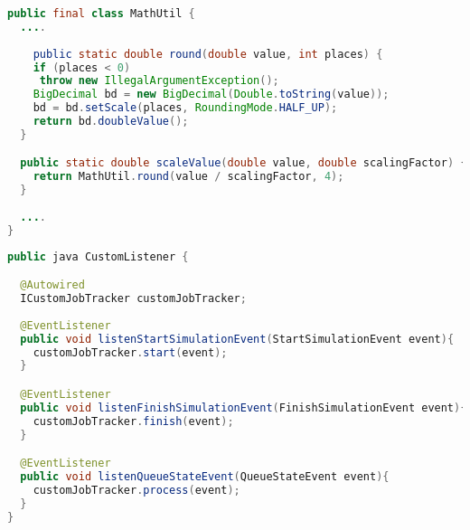 \begin{lstlisting}[language=Java,firstnumber=1, caption={MathUtil.java}, label=lst:math]
public final class MathUtil {
  ....
  
    public static double round(double value, int places) {
    if (places < 0)
     throw new IllegalArgumentException();
    BigDecimal bd = new BigDecimal(Double.toString(value));
    bd = bd.setScale(places, RoundingMode.HALF_UP);
    return bd.doubleValue();
  }

  public static double scaleValue(double value, double scalingFactor) {
    return MathUtil.round(value / scalingFactor, 4);
  }
  
  ....
}

\end{lstlisting}


\begin{lstlisting}[language=Java,firstnumber=1, caption={CustomListener.java}, label=lst:listener]
public java CustomListener {

  @Autowired
  ICustomJobTracker customJobTracker;
  
  @EventListener
  public void listenStartSimulationEvent(StartSimulationEvent event){
    customJobTracker.start(event);  
  }

  @EventListener
  public void listenFinishSimulationEvent(FinishSimulationEvent event){
    customJobTracker.finish(event);
  }

  @EventListener
  public void listenQueueStateEvent(QueueStateEvent event){
    customJobTracker.process(event);
  }
}

\end{lstlisting}





